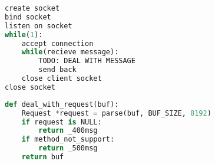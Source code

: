 \begin{lstlisting}[language=python, name={echo_server}]
create socket
bind socket
listen on socket
while(1):
    accept connection
    while(recieve message):
        TODO: DEAL WITH MESSAGE
        send back
    close client socket
close socket
\end{lstlisting}
    
\begin{lstlisting}[language=python, name={处理数据}]
def deal_with_request(buf):
    Request *request = parse(buf, BUF_SIZE, 8192)
    if request is NULL:
        return _400msg
    if method_not_support:
        return _500msg
    return buf
\end{lstlisting}


